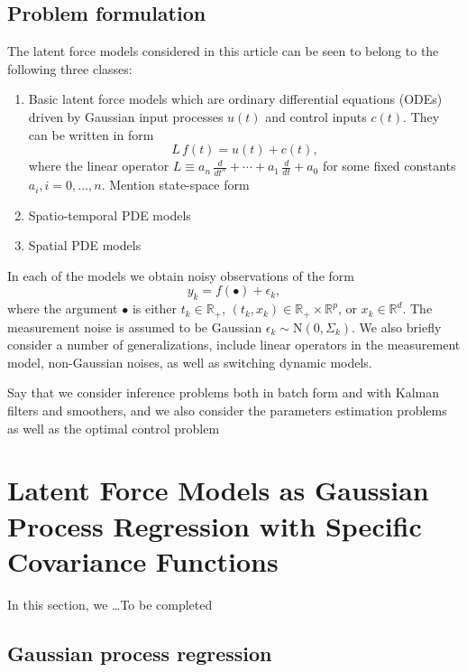 \documentclass[journal]{IEEEtran}
\newcommand{\simo}[1]{{\color{red}#1}}
\begin{document}
\subsection{Problem formulation}
%
The latent force models considered in this article can be seen to belong to the following three classes:
%
\begin{enumerate}
\item Basic latent force models which are ordinary differential equations (ODEs) driven by Gaussian input processes $u(t)$ and control inputs $c(t)$. They can be written in form
%
\begin{equation}
  L \, f(t) = u(t) + c(t),
\end{equation}
%
where the linear operator $L\equiv a_n \, \frac{d}{dt^{n}} + \cdots + a_1 \, \frac{d}{dt} + a_0$ for some fixed constants $a_i, i=0,\ldots,n$. \simo{Mention state-space form}

\item \simo{Spatio-temporal PDE models}

\item \simo{Spatial PDE models}
\end{enumerate}

In each of the models we obtain noisy observations of the form
%
\begin{equation}
  y_k = f(\bullet) + \epsilon_k,
\end{equation}
%
where the argument $\bullet$ is either $t_k \in \mathbb{R}_+$, $(t_k,x_k) \in \mathbb{R}_+ \times \mathbb{R}^p$, or $x_k \in \mathbb{R}^d$. The measurement noise is assumed to be Gaussian $\epsilon_k \sim \mathrm{N}(0,\Sigma_k)$. We also briefly consider a number of generalizations, include linear operators in the measurement model, non-Gaussian noises, as well as switching dynamic models.

\simo{Say that we consider inference problems both in batch form and with Kalman filters and smoothers, and we also consider the parameters estimation problems as well as the optimal control problem}


\section{Latent Force Models as Gaussian Process Regression with Specific Covariance Functions}

In this section, we \ldots \simo{To be completed}

\subsection{Gaussian process regression}\label{sec:gp:regression}
%
\end{document}
